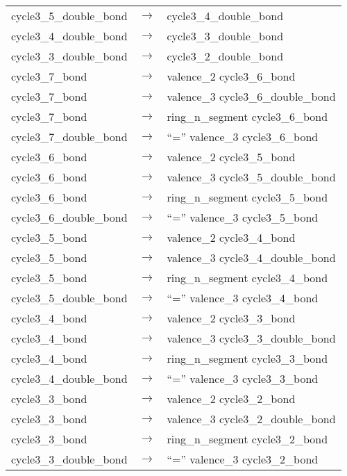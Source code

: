 \documentclass[../Document.tex]{subfiles}
\begin{document}
\begin{longtable}{m{} p{} p{}}
    cycle3\_5\_double\_bond & $\rightarrow$ & cycle3\_4\_double\_bond \\
    cycle3\_4\_double\_bond & $\rightarrow$ & cycle3\_3\_double\_bond \\
    cycle3\_3\_double\_bond & $\rightarrow$ & cycle3\_2\_double\_bond \\
    cycle3\_7\_bond & $\rightarrow$ & valence\_2 cycle3\_6\_bond \\
    cycle3\_7\_bond & $\rightarrow$ & valence\_3 cycle3\_6\_double\_bond \\
    cycle3\_7\_bond & $\rightarrow$ & ring\_n\_segment cycle3\_6\_bond \\
    cycle3\_7\_double\_bond & $\rightarrow$ & ``='' valence\_3 cycle3\_6\_bond \\
    cycle3\_6\_bond & $\rightarrow$ & valence\_2 cycle3\_5\_bond \\
    cycle3\_6\_bond & $\rightarrow$ & valence\_3 cycle3\_5\_double\_bond \\
    cycle3\_6\_bond & $\rightarrow$ & ring\_n\_segment cycle3\_5\_bond \\
    cycle3\_6\_double\_bond & $\rightarrow$ & ``='' valence\_3 cycle3\_5\_bond \\
    cycle3\_5\_bond & $\rightarrow$ & valence\_2 cycle3\_4\_bond \\
    cycle3\_5\_bond & $\rightarrow$ & valence\_3 cycle3\_4\_double\_bond \\
    cycle3\_5\_bond & $\rightarrow$ & ring\_n\_segment cycle3\_4\_bond \\
    cycle3\_5\_double\_bond & $\rightarrow$ & ``='' valence\_3 cycle3\_4\_bond \\
    cycle3\_4\_bond & $\rightarrow$ & valence\_2 cycle3\_3\_bond \\
    cycle3\_4\_bond & $\rightarrow$ & valence\_3 cycle3\_3\_double\_bond \\
    cycle3\_4\_bond & $\rightarrow$ & ring\_n\_segment cycle3\_3\_bond \\
    cycle3\_4\_double\_bond & $\rightarrow$ & ``='' valence\_3 cycle3\_3\_bond \\
    cycle3\_3\_bond & $\rightarrow$ & valence\_2 cycle3\_2\_bond \\
    cycle3\_3\_bond & $\rightarrow$ & valence\_3 cycle3\_2\_double\_bond \\
    cycle3\_3\_bond & $\rightarrow$ & ring\_n\_segment cycle3\_2\_bond \\
    cycle3\_3\_double\_bond & $\rightarrow$ & ``='' valence\_3 cycle3\_2\_bond \\

\end{longtable}
\end{document}

